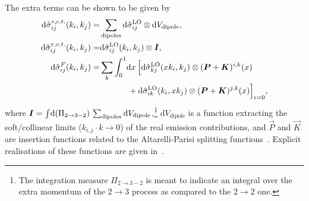 \documentclass[../main.tex]{subfiles}
\begin{document}
The extra terms can be shown to be given by
\begin{subequations}
  \begin{align}
    \mathrm{d}\hat\sigma_{ij}^{r, c.t.}(k_i,k_j) = & \sum_{\text{dipoles}} \mathrm{d}\hat\sigma_{ij}^\text{LO} \otimes \mathrm{d}V_{\text{dipole}},                        \\
    \mathrm{d}\hat\sigma_{ij}^{v, c.t.}(k_i,k_j) = & \mathrm{d}\hat\sigma_{ij}^\text{LO}(k_i,k_j) \otimes \vec{I},                                                         \\
    \nonumber
    \mathrm{d}\hat\sigma_{ij}^{F}(k_i, k_j) =      & \sum_{k}\integral[_0^1]{x} \Bigl[\mathrm{d}\hat\sigma_{k j}^\text{LO}(xk_i,k_j) \otimes (\vec{P}+\vec{K})^{i,k}(x)    \\
                                                   & \hspace{1.2cm} + \mathrm{d}\hat\sigma^\text{LO}_{ik}(k_i,xk_j) \otimes (\vec{P}+\vec{K})^{j,k}(x)\Bigr]_{\epsilon=0},
  \end{align}
\end{subequations}
where \(\vec{I} = \integral{(\Pi_{2 \to 3-2})} \sum_{\text{dipoles}} \mathrm{d}V_{\text{dipole}}\),\footnote{The integration measure \(\Pi_{2\to 3-2}\) is meant to indicate an integral over the extra momentum of the \(2 \to 3\) process as compared to the \(2 \to 2\) one.} \(\mathrm{d}V_{\text{dipole}}\) is a function extracting the soft/collinear limits (\(k_{i,j} \cdot k \to 0\)) of the real emission contributions, and \(\vec{P}\) and \(\vec{K}\) are insertion functions related to the Altarelli-Parisi splitting functions~\cite{Altarelli:1977zs}.
Explicit realisations of these functions are given in~\cite{Catani:1996vz}.


\ifSubfilesClassLoaded{%
  {}
  
}{}
\end{document}
